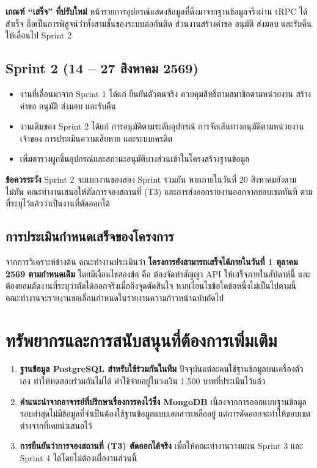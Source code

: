 \vspace{0.8em}
\noindent\textbf{เกณฑ์ ``เสร็จ'' ที่ปรับใหม่} หน้ารายการอุปกรณ์แสดงข้อมูลที่ดึงมาจากฐานข้อมูลจริงผ่าน tRPC ได้สำเร็จ ถือเป็นการพิสูจน์ว่าทั้งสามชั้นของระบบต่อกันติด ส่วนงานสร้างคำขอ อนุมัติ ส่งมอบ และรับคืน ให้เลื่อนไป Sprint 2

\subsection{Sprint 2 (14 – 27 สิงหาคม 2569)}

\begin{itemize}
  \item งานที่เลื่อนมาจาก Sprint 1 ได้แก่ ยืนยันตัวตนจริง ควบคุมสิทธิ์ตามสมาชิกตามหน่วยงาน สร้างคำขอ อนุมัติ ส่งมอบ และรับคืน
  \item งานเดิมของ Sprint 2 ได้แก่ การอนุมัติตามระดับอุปกรณ์ การจัดเส้นทางอนุมัติตามหน่วยงานเจ้าของ การประเมินความเสียหาย และระบบเครดิต
  \item เพิ่มตารางผูกชิ้นอุปกรณ์และสถานะอนุมัติบางส่วนเข้าในโครงสร้างฐานข้อมูล
\end{itemize}

\noindent\textbf{ข้อควรระวัง} Sprint 2 จะแบกงานของสอง Sprint รวมกัน หากภายในวันที่ 20 สิงหาคมยังตามไม่ทัน คณะทำงานเสนอให้ตัดการจองสถานที่ (T3) และการส่งออกรายงานออกจากขอบเขตทันที ตามที่ระบุไว้แล้วว่าเป็นงานที่ตัดออกได้

\subsection{การประเมินกำหนดเสร็จของโครงการ}

จากการวิเคราะห์ข้างต้น คณะทำงานประเมินว่า \textbf{โครงการยังสามารถเสร็จได้ภายในวันที่ 1 ตุลาคม 2569 ตามกำหนดเดิม} โดยมีเงื่อนไขสองข้อ คือ ต้องจัดทำสัญญา API ให้เสร็จภายในสัปดาห์นี้ และต้องยอมตัดงานที่ระบุว่าตัดได้ออกจริงเมื่อถึงจุดตัดสินใจ หากเงื่อนไขข้อใดข้อหนึ่งไม่เป็นไปตามนี้ คณะทำงานจะรายงานขอเลื่อนกำหนดในรายงานความก้าวหน้าฉบับถัดไป

\section{ทรัพยากรและการสนับสนุนที่ต้องการเพิ่มเติม}

\begin{enumerate}
  \item \textbf{ฐานข้อมูล PostgreSQL สำหรับใช้ร่วมกันในทีม} ปัจจุบันแต่ละคนใช้ฐานข้อมูลบนเครื่องตัวเอง ทำให้ทดสอบร่วมกันไม่ได้ ค่าใช้จ่ายอยู่ในวงเงิน 1{,}500 บาทที่ประเมินไว้แล้ว
  \item \textbf{คำแนะนำจากอาจารย์ที่ปรึกษาเรื่องการคงไว้ซึ่ง MongoDB} เนื่องจากการออกแบบฐานข้อมูลรอบล่าสุดไม่มีข้อมูลที่จำเป็นต้องใช้ฐานข้อมูลแบบเอกสารเหลืออยู่ แต่การตัดออกจะทำให้ขอบเขตต่างจากที่เคยนำเสนอไว้
  \item \textbf{การยืนยันว่าการจองสถานที่ (T3) ตัดออกได้จริง} เพื่อให้คณะทำงานวางแผน Sprint 3 และ Sprint 4 ได้โดยไม่ต้องเผื่องานส่วนนี้
\end{enumerate}

